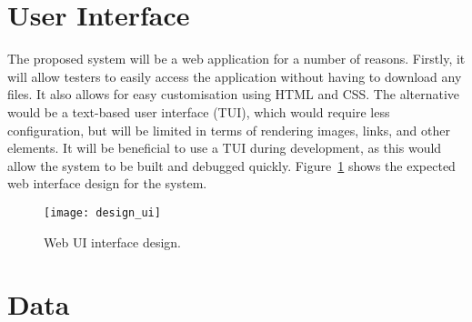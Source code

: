\newpage
\section{User Interface}
The proposed system will be a web application for a number of reasons. Firstly, it will allow testers to easily access the application without having to download any files. It also allows for easy customisation using HTML and CSS. The alternative would be a text-based user interface (TUI), which would require less configuration, but will be limited in terms of rendering images, links, and other elements. It will be beneficial to use a TUI during development, as this would allow the system to be built and debugged quickly. Figure~\ref{fig:design_ui} shows the expected web interface design for the system.

\begin{figure}[h]
	\begin{center}
		\texttt{[image: design\_ui]}
	\end{center}
	\caption{Web UI interface design.}
	\label{fig:design_ui}
\end{figure}

\section{Data}